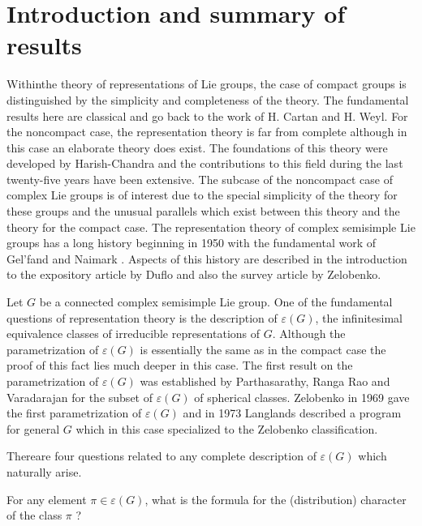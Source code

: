 
\chapter{Introduction and summary of results}\label{sec1}

\setcounter{pageoriginal}{1}
Within\pageoriginale the theory of representations of Lie groups, the
case of compact groups is distinguished by the simplicity and
completeness of the theory. The fundamental results here are classical
and go back to the work of H. Cartan and H. Weyl. For the noncompact
case, the representation theory is far from complete although in this
case an elaborate theory does exist. The foundations of this theory
were developed by Harish-Chandra and the contributions to this field
during the last twenty-five years have been extensive. The subcase of
the noncompact case of complex Lie groups is of interest due to the
special simplicity of the theory for these groups and the unusual
parallels which exist between this theory and the theory for the
compact case. The representation theory of complex semisimple Lie
groups has a long history beginning in 1950 with the fundamental work
of Gel'fand and Naimark \cite{key20}.  Aspects of this history are
described in the introduction to the expository article \cite{key9} by
Duflo and also the survey article \cite{key37} by Zelobenko.

Let $G$ be a connected complex semisimple Lie group. One of the
fundamental questions of representation theory is the description of\break
$\varepsilon (G)$, the infinitesimal equivalence classes of
irreducible representations of $G$. Although the parametrization of
$\varepsilon(G)$ is essentially the same as in the compact case the
proof of this fact lies much deeper in this case. The first result on
the parametrization of $\varepsilon (G)$ was established by
Parthasarathy, Ranga Rao and Varadarajan \cite{key30} for the subset
of $\varepsilon(G)$ of spherical classes. Zelobenko \cite{key36} in
1969 gave the first parametrization of $\varepsilon (G)$ and in 1973
Langlands \cite{key27} described a program for general $G$ which in
this case specialized to the Zelobenko classification.

There\pageoriginale are four questions related to any complete
description of $\varepsilon (G)$ which naturally arise.

\smallskip
{} For any element $\pi \in \varepsilon
(G)$, what is the formula for the (distribution) character of the
class $\pi$ ?

